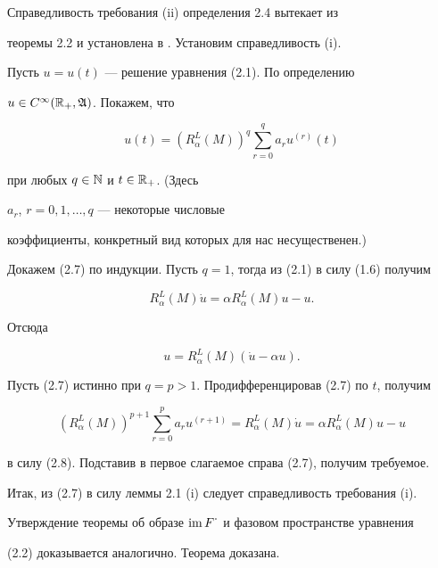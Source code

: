  


\begin{pf} Справедливость требования (ii) определения 2.4 вытекает из 


теоремы 2.2 и установлена в \cite{Sv5}. Установим справедливость (i). 


 


Пусть $u=u(t)$ --- решение уравнения (2.1). По определению 


$u\in C^\infty(\Bbb R_+,\frak A)$. Покажем, что 


\begin{equation} 


u(t)=(R^L_\alpha(M))^q\sum^q_{r=0}a_ru^{(r)}(t) 


\end{equation} 


при любых $q\in\Bbb N$ и $t\in\Bbb R_+$. (Здесь 


$a_r$, $r=0,1,\dotsc,q$ --- некоторые числовые 


коэффициенты, конкретный вид которых для нас несущественен.) 


 


Докажем (2.7) по индукции. Пусть $q=1$, тогда из (2.1) в силу (1.6) получим 


\begin{equation} 


R^L_\alpha(M)\Dot u=\alpha R^L_\alpha(M)u-u. 


\end{equation} 


Отсюда 


$$ 


u=R^L_\alpha(M)(\Dot u-\alpha u). 


$$ 


 


Пусть (2.7) истинно при $q=p>1$. Продифференцировав (2.7) по $t$, получим 


\begin{equation} 


(R^L_\alpha(M))^{p+1}\sum^p_{r=0}a_ru^{(r+1)}= 


R^L_\alpha(M)\Dot u=\alpha R^L_\alpha(M)u-u 


\end{equation} 


в силу (2.8). Подставив в первое слагаемое справа (2.7), получим требуемое. 


Итак, из (2.7) в силу леммы 2.1 (i) следует справедливость требования (i). 


Утверждение теоремы об образе $\operatorname{im} F^{\textstyle\cdot}$ и фазовом пространстве уравнения 


(2.2) доказывается аналогично. Теорема доказана. 


\end{pf} 


